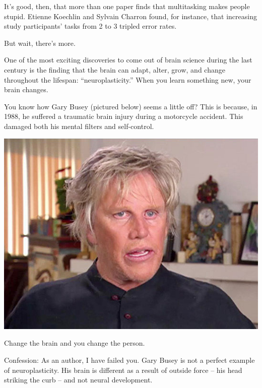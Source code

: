 It's good, then, that more than one paper finds that multitasking makes people stupid. Etienne
Koechlin and Sylvain Charron found, for instance, that increasing study
participants' tasks from 2 to 3 tripled error rates. \cite{charron2010divided}

But wait, there's more.

One of the most exciting discoveries to come out of brain science during
the
last century is the finding that the brain can adapt, alter, grow, and change
throughout the lifespan: ``neuroplasticity.''
When you learn something new, your brain changes.

You know how Gary Busey (pictured below) seems a little off? This is because, in 1988, he
suffered a traumatic brain injury during a motorcycle accident. This damaged both his mental filters and self-control.

\includegraphics[width=\textwidth]{graphics/gary-busey.jpg}

Change the brain and you change the person.

Confession: As an author, I have
failed you. Gary Busey is not a perfect example of neuroplasticity. His brain is
different as a result of outside force -- his head striking
the curb -- and not neural development.

